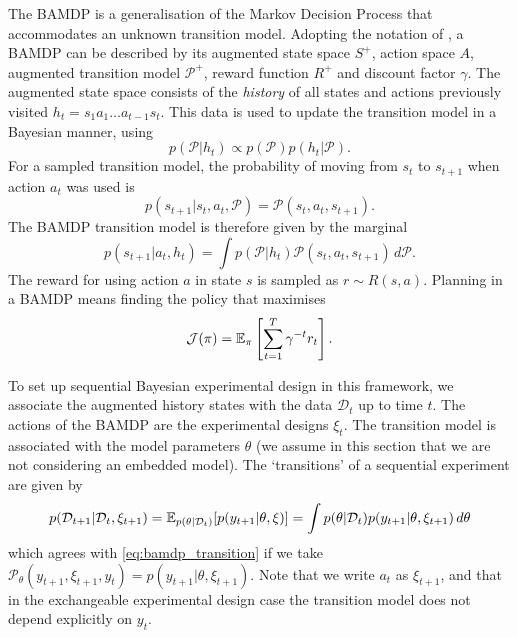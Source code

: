 \documentclass[a4paper, 10pt]{report}
\theoremstyle{plain}
\begin{document}
	The BAMDP is a generalisation of the Markov Decision Process \citep{bellman1957markovian,duff2002optimal} that accommodates an unknown transition model.
	Adopting the notation of \citet{guez2012efficient}, a BAMDP can be described by its augmented state space $S^+$, action space $A$, augmented transition model $\mathcal{P}^+$, reward function $R^+$ and discount factor $\gamma$.
	The augmented state space consists of the \emph{history} of all states and actions previously visited $h_t = s_1a_1\dots a_{t-1}s_t$.
	This data is used to update the transition model in a Bayesian manner, using
	\begin{equation}
	p(\mathcal{P}|h_t) \propto p(\mathcal{P})p(h_t|\mathcal{P}).
	\end{equation}
	For a sampled transition model, the probability of moving from $s_t$ to $s_{t+1}$ when action $a_t$ was used is
	\begin{equation}
	p(s_{t+1}|s_t,a_t,\mathcal{P}) = \mathcal{P}(s_{t},a_t,s_{t+1}).
	\end{equation}
	The BAMDP transition model is therefore given by the marginal \citep{guez2012efficient}
	\begin{equation}
	\label{eq:bamdp_transition}
	p(s_{t+1}|a_t,h_t) = \int p(\mathcal{P}|h_t)\mathcal{P}(s_{t},a_t,s_{t+1})\,d\mathcal{P}.
	\end{equation}
	The reward for using action $a$ in state $s$ is sampled as $r \sim R(s,a)$.
	Planning in a BAMDP means finding the policy that maximises 
	\begin{equation}
	\label{eq:bamdp_objective}
	\mathcal{J}(\pi) = \mathbb{E}_\pi\left[ \sum_{t=1}^T \gamma^{-t}r_t \right].
	\end{equation}
	
	To set up sequential Bayesian experimental design in this framework, we associate the augmented history states with the data $\mathcal{D}_t$ up to time $t$.
	The actions of the BAMDP are the experimental designs $\xi_t$.
	The transition model is associated with the model parameters $\theta$ (we assume in this section that we are not considering an embedded model).
	The `transitions' of a sequential experiment are given by
	\begin{equation}
	\label{eq:soed_transition}
	p(\mathcal{D}_{t+1}|\mathcal{D}_t,\xi_{t+1}) = \mathbb{E}_{p(\theta|\mathcal{D}_t)}[p(y_{t+1}|\theta,\xi)] = \int p(\theta|\mathcal{D}_t)p(y_{t+1}|\theta,\xi_{t+1}) \, d\theta
	\end{equation}
	which agrees with \eqref{eq:bamdp_transition} if we take $\mathcal{P}_\theta(y_{t+1},\xi_{t+1},y_t) = p(y_{t+1}|\theta,\xi_{t+1})$.
	Note that we write $a_t$ as $\xi_{t+1}$, and that in the exchangeable experimental design case the transition model does not depend explicitly on $y_t$.
	
\end{document}

